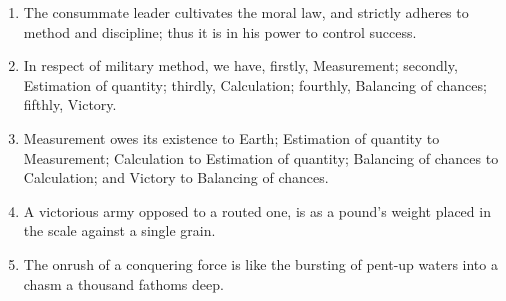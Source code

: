 \documentclass[oneside]{book}
\begin{document}
\begin{enumerate}
	\item The consummate leader cultivates the moral law, and strictly adheres to method and discipline; thus it is in his power to control success.
	\item In respect of military method, we have, firstly, Measurement; secondly, Estimation of quantity; thirdly, Calculation; fourthly, Balancing of chances; fifthly, Victory.
	\item Measurement owes its existence to Earth; Estimation of quantity to Measurement; Calculation to Estimation of quantity; Balancing of chances to Calculation; and Victory to Balancing of chances.
	\item A victorious army opposed to a routed one, is as a pound's weight placed in the scale against a single grain.
	\item The onrush of a conquering force is like the bursting of pent-up waters into a chasm a thousand fathoms deep.
\end{enumerate}
\end{document}
